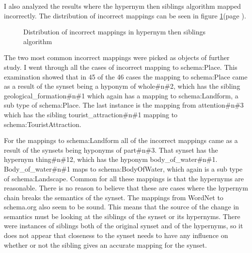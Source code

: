 I also analyzed the results where the hypernym then siblings algorithm mapped incorrectly.
The distribution of incorrect mappings can be seen in figure \ref{fig:incorrect}(page \pageref{fig:incorrect}).

\begin{figure}[ht]
	\centering
	\caption{Distribution of incorrect mappings in hypernym then siblings algorithm}
	\label{fig:incorrect}
\end{figure}

The two most common incorrect mappings were picked as objects of further study.
I went through all the cases of incorrect mapping to schema:Place.
This examination showed that in 45 of the 46 cases the mapping to schema:Place came as a result of
the synset being a hyponym of whole\#n\#2, which has the sibling geological\_formation\#n\#1 which again has a mapping to
schema:Landform, a sub type of schema:Place.
The last instance is the mapping from attention\#n\#3 which has the sibling tourist\_attraction\#n\#1 mapping to
schema:TouristAttraction.

For the mappings to schema:Landform all of the incorrect mappings came as a result of the synsets being hyponyms of part\#n\#3.
That synset has the hypernym thing\#n\#12, which has the hyponym body\_of\_water\#n\#1.
Body\_of\_water\#n\#1 maps to schema:BodyOfWater, which again is a sub type of schema:Landscape.
Common for all these mappings is that the hypernyms are reasonable.
There is no reason to believe that these are cases where the hypernym chain breaks the semantics of the synset.
The mappings from WordNet to schema.org also seem to be sound.
This means that the source of the change in semantics must be looking at the siblings of the synset or its hypernyms.
There were instances of siblings both of the original synset and of the hypernyms,
so it does not appear that closeness to the synset needs to have any influence on whether or not the sibling gives
an accurate mapping for the synset.

